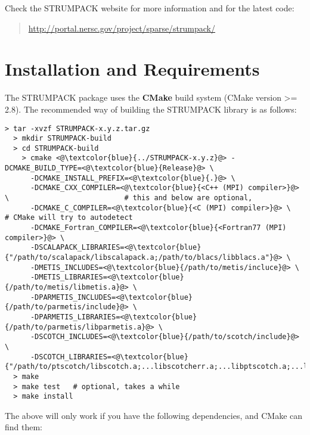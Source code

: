 \documentclass{article}
\begin{document}
\noindent Check the STRUMPACK website for more information and for the
latest code:
\begin{quote}
  \url{http://portal.nersc.gov/project/sparse/strumpack/}
\end{quote}


\section{Installation and Requirements}\label{sec::installation}
The STRUMPACK package uses the \textbf{CMake} build system (CMake
version >= 2.8). The recommended way of building the STRUMPACK library
is as follows:
\begin{lstlisting}[style=bash]
  > tar -xvzf STRUMPACK-x.y.z.tar.gz
  > mkdir STRUMPACK-build
  > cd STRUMPACK-build
    > cmake <@\textcolor{blue}{../STRUMPACK-x.y.z}@> -DCMAKE_BUILD_TYPE=<@\textcolor{blue}{Release}@> \
      -DCMAKE_INSTALL_PREFIX=<@\textcolor{blue}{.}@> \
      -DCMAKE_CXX_COMPILER=<@\textcolor{blue}{<C++ (MPI) compiler>}@> \                           # this and below are optional,
      -DCMAKE_C_COMPILER=<@\textcolor{blue}{<C (MPI) compiler>}@> \                               # CMake will try to autodetect
      -DCMAKE_Fortran_COMPILER=<@\textcolor{blue}{<Fortran77 (MPI) compiler>}@> \
      -DSCALAPACK_LIBRARIES=<@\textcolor{blue}{"/path/to/scalapack/libscalapack.a;/path/to/blacs/libblacs.a"}@> \
      -DMETIS_INCLUDES=<@\textcolor{blue}{/path/to/metis/incluce}@> \
      -DMETIS_LIBRARIES=<@\textcolor{blue}{/path/to/metis/libmetis.a}@> \
      -DPARMETIS_INCLUDES=<@\textcolor{blue}{/path/to/parmetis/include}@> \
      -DPARMETIS_LIBRARIES=<@\textcolor{blue}{/path/to/parmetis/libparmetis.a}@> \
      -DSCOTCH_INCLUDES=<@\textcolor{blue}{/path/to/scotch/include}@> \
      -DSCOTCH_LIBRARIES=<@\textcolor{blue}{"/path/to/ptscotch/libscotch.a;...libscotcherr.a;...libptscotch.a;...libptscotcherr.a"}@>
  > make
  > make test   # optional, takes a while
  > make install
\end{lstlisting}
The above will only work if you have the following dependencies, and
CMake can find them:
\end{document}
